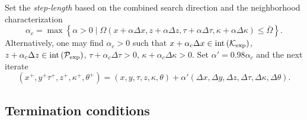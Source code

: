 \documentclass[11pt]{article}
\theoremstyle{definition}
\theoremstyle{plain}
\def\interior{\protect{\textnormal{int}}}
\begin{document}
Set the \textit{step-length} based on the combined search direction and the neighborhood characterization
\[\alpha_c = \max\left\{ \alpha >0 \mid \Omega(x+\alpha \Delta x, z+\alpha \Delta z, \tau + \alpha \Delta \tau, \kappa + \alpha \Delta \kappa) \leq \bar{\Omega} \right\}.\]
Alternatively, one may find $\alpha_c>0$ such that $x + \alpha_c \Delta x \in \interior \left(\mathcal{K}_{\exp}\right)$, $z + \alpha_c \Delta z \in \interior \left(\mathcal{P}_{\exp}\right)$, $\tau + \alpha_c \Delta \tau > 0$, $\kappa + \alpha_c \Delta \kappa > 0$.
Set $\alpha' = 0.98 \alpha_c$ and the next iterate 
\[(x^+, y^+ \tau^+, z^+,\kappa^+, \theta^+) = (x,y, \tau, z,\kappa, \theta)+\alpha' (\Delta x, \Delta y, \Delta z, \Delta \tau, \Delta \kappa, \Delta \theta).\]
\subsection{Termination conditions}

\newpage
\appendix
\end{document}
